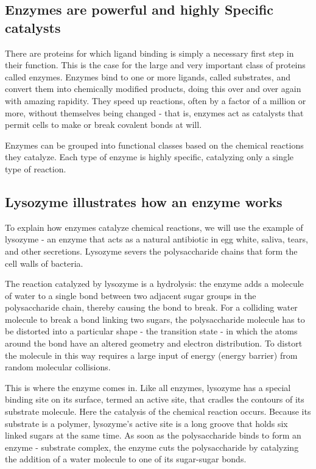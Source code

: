 \subsection{Enzymes are powerful and highly Specific catalysts}

There are proteins for which ligand binding is simply a necessary first step
in their function. This is the case for the large and very important class
of proteins called enzymes. Enzymes bind to one or more ligands, called substrates,
and convert them into chemically modified products, doing this over and over again with amazing rapidity.
They speed up reactions, often by a factor of a
million or more, without themselves being changed - that is, enzymes act
as catalysts that permit cells to make or break covalent bonds at will.

Enzymes can be grouped into functional classes based on the chemical
reactions they catalyze. Each type of enzyme is highly specific,
catalyzing only a single type of reaction.

\subsection{Lysozyme illustrates how an enzyme works}

To explain how enzymes catalyze chemical reactions, we will use the
example of lysozyme - an enzyme that acts as a natural antibiotic in egg
white, saliva, tears, and other secretions. Lysozyme severs the polysaccharide
chains that form the cell walls of bacteria.

The reaction catalyzed by lysozyme is a hydrolysis: the enzyme adds a
molecule of water to a single bond between two adjacent sugar groups in
the polysaccharide chain, thereby causing the bond to break.
For a colliding water molecule to break a bond linking two sugars, the
polysaccharide molecule has to be distorted into a particular shape - the
transition state - in which the atoms around the bond have an altered
geometry and electron distribution. To distort the molecule in this way
requires a large input of energy (energy barrier) from random molecular collisions.

This is where the enzyme comes in. Like all enzymes, lysozyme has a
special binding site on its surface, termed an active site, that cradles the
contours of its substrate molecule. Here the catalysis of the chemical reaction
occurs. Because its substrate is a polymer, lysozyme’s active site is a
long groove that holds six linked sugars at the same time. As soon as the
polysaccharide binds to form an enzyme - substrate complex, the enzyme
cuts the polysaccharide by catalyzing the addition of a water molecule to
one of its sugar-sugar bonds.

